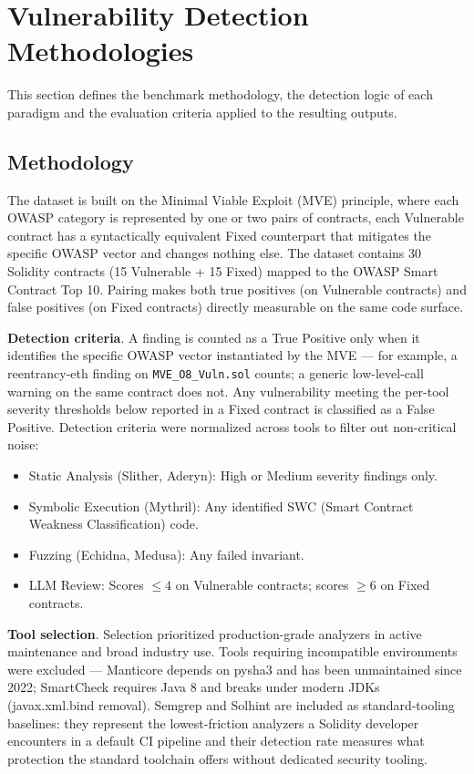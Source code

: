 \section{Vulnerability Detection Methodologies}

This section defines the benchmark methodology, the detection logic of each paradigm and the evaluation criteria applied to the resulting outputs.

\subsection{Methodology}

The dataset is built on the Minimal Viable Exploit (MVE) principle, where each OWASP category is represented by one or two pairs of contracts, each Vulnerable contract has a syntactically equivalent Fixed counterpart that mitigates the specific OWASP vector and changes nothing else. The dataset contains 30 Solidity contracts (15 Vulnerable + 15 Fixed) mapped to the OWASP Smart Contract Top 10. Pairing makes both true positives (on Vulnerable contracts) and false positives (on Fixed contracts) directly measurable on the same code surface.

\textbf{Detection criteria}. A finding is counted as a True Positive only when it identifies the specific OWASP vector instantiated by the MVE — for example, a reentrancy-eth finding on \texttt{MVE\_O8\_Vuln.sol} counts; a generic low-level-call warning on the same contract does not. Any vulnerability meeting the per-tool severity thresholds below reported in a Fixed contract is classified as a False Positive. Detection criteria were normalized across tools to filter out non-critical noise:
\begin{itemize}
  \item Static Analysis (Slither, Aderyn): High or Medium severity findings only.
  \item Symbolic Execution (Mythril): Any identified SWC (Smart Contract Weakness Classification) code.
  \item Fuzzing (Echidna, Medusa): Any failed invariant.
  \item LLM Review: Scores $\leq 4$ on Vulnerable contracts; scores $\geq 6$ on Fixed contracts.
\end{itemize}

\textbf{Tool selection}. Selection prioritized production-grade analyzers in active maintenance and broad industry use. Tools requiring incompatible environments were excluded — Manticore depends on pysha3 and has been unmaintained since 2022; SmartCheck requires Java 8 and breaks under modern JDKs (javax.xml.bind removal). Semgrep and Solhint are included as standard-tooling baselines: they represent the lowest-friction analyzers a Solidity developer encounters in a default CI pipeline and their detection rate measures what protection the standard toolchain offers without dedicated security tooling.

